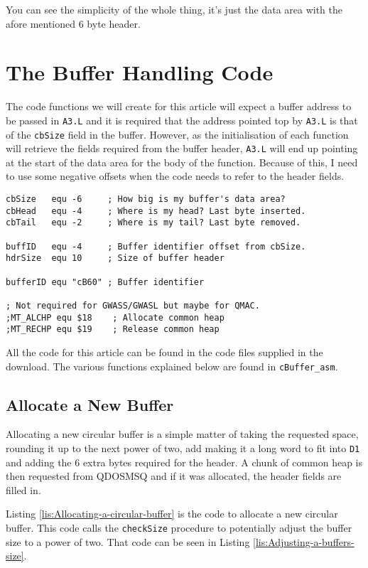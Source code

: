 You can see the simplicity of the whole thing, it's just the data
area with the afore mentioned 6 byte header.

\section{The Buffer Handling Code}

The code functions we will create for this article will expect a buffer
address to be passed in \texttt{A3.L} and it is required that the
address pointed top by \texttt{A3.L} is that of the \texttt{cbSize}
field in the buffer. However, as the initialisation of each function
will retrieve the fields required from the buffer header, \texttt{A3.L}
will end up pointing at the start of the data area for the body of
the function. Because of this, I need to use some negative offsets
when the code needs to refer to the header fields.

\begin{lstlisting}
cbSize   equ -6     ; How big is my buffer's data area?
cbHead   equ -4     ; Where is my head? Last byte inserted.
cbTail   equ -2     ; Where is my tail? Last byte removed.

buffID   equ -4     ; Buffer identifier offset from cbSize.
hdrSize  equ 10     ; Size of buffer header

bufferID equ "cB60" ; Buffer identifier

; Not required for GWASS/GWASL but maybe for QMAC.
;MT_ALCHP equ $18    ; Allocate common heap
;MT_RECHP equ $19    ; Release common heap
\end{lstlisting}

All the code for this article can be found in the code files supplied
in the download. The various functions explained below are found in
\texttt{cBuffer\_asm}.

\subsection{Allocate a New Buffer}

Allocating a new circular buffer is a simple matter of taking the
requested space, rounding it up to the next power of two, add making
it a long word to fit into \texttt{D1} and adding the 6 extra bytes
required for the header. A chunk of common heap is then requested
from QDOSMSQ and if it was allocated, the header fields are filled
in.

Listing \ref{lis:Allocating-a-circular-buffer} is the code to allocate
a new circular buffer. This code calls the \texttt{checkSize} procedure
to potentially adjust the buffer size to a power of two. That code
can be seen in Listing \ref{lis:Adjusting-a-buffers-size}.

